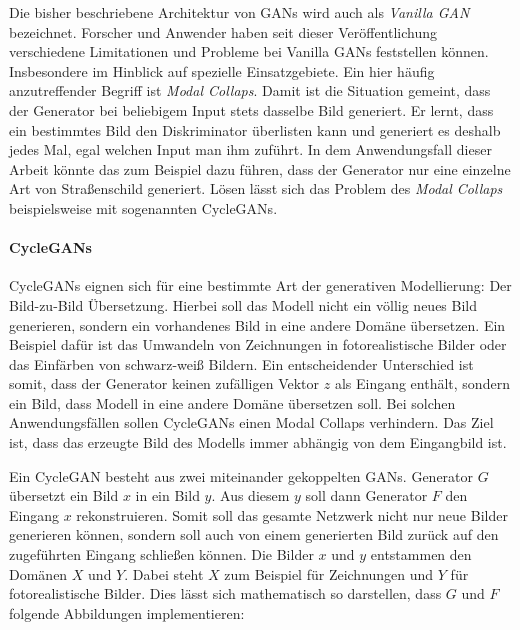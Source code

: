 
Die bisher beschriebene Architektur von \acp{GAN} wird auch als \emph{Vanilla \ac{GAN}} bezeichnet. Forscher und Anwender haben seit dieser Veröffentlichung verschiedene Limitationen und Probleme bei Vanilla \acp{GAN} feststellen können. Insbesondere im Hinblick auf spezielle Einsatzgebiete. Ein hier häufig anzutreffender Begriff ist \emph{Modal Collaps}. Damit ist die Situation gemeint, dass der Generator bei beliebigem Input stets dasselbe Bild generiert. Er lernt, dass ein bestimmtes Bild den Diskriminator überlisten kann und generiert es deshalb jedes Mal, egal welchen Input man ihm zuführt. In dem Anwendungsfall dieser Arbeit könnte das zum Beispiel dazu führen, dass der Generator nur eine einzelne Art von Straßenschild generiert. Lösen lässt sich das Problem des \emph{Modal Collaps} beispielsweise mit sogenannten \acp{CycleGAN}. \cite{visualApproach}

\paragraph{CycleGANs}
\acp{CycleGAN} eignen sich für eine bestimmte Art der generativen Modellierung: Der Bild-zu-Bild Übersetzung. Hierbei soll das Modell nicht ein völlig neues Bild generieren, sondern ein vorhandenes Bild in eine andere Domäne übersetzen. Ein Beispiel dafür ist das Umwandeln von Zeichnungen in fotorealistische Bilder oder das Einfärben von schwarz-weiß Bildern. Ein entscheidender Unterschied ist somit, dass der Generator keinen zufälligen Vektor $z$ als Eingang enthält, sondern ein Bild, dass Modell in eine andere Domäne übersetzen soll. Bei solchen Anwendungsfällen sollen \acp{CycleGAN} einen Modal Collaps verhindern. Das Ziel ist, dass das erzeugte Bild des Modells immer abhängig von dem Eingangbild ist. \cite{cycleGAN}

Ein \ac{CycleGAN} besteht aus zwei miteinander gekoppelten \acp{GAN}. Generator $G$ übersetzt ein Bild $x$ in ein Bild $y$. Aus diesem $y$ soll dann Generator $F$ den Eingang $x$ rekonstruieren. Somit soll das gesamte Netzwerk nicht nur neue Bilder generieren können, sondern soll auch von einem generierten Bild zurück auf den zugeführten Eingang schließen können. Die Bilder $x$ und $y$ entstammen den Domänen $X$ und $Y$. Dabei steht $X$ zum Beispiel für Zeichnungen und $Y$ für fotorealistische Bilder. Dies lässt sich mathematisch so darstellen, dass $G$ und $F$ folgende Abbildungen implementieren: \cite{cycleGAN}

